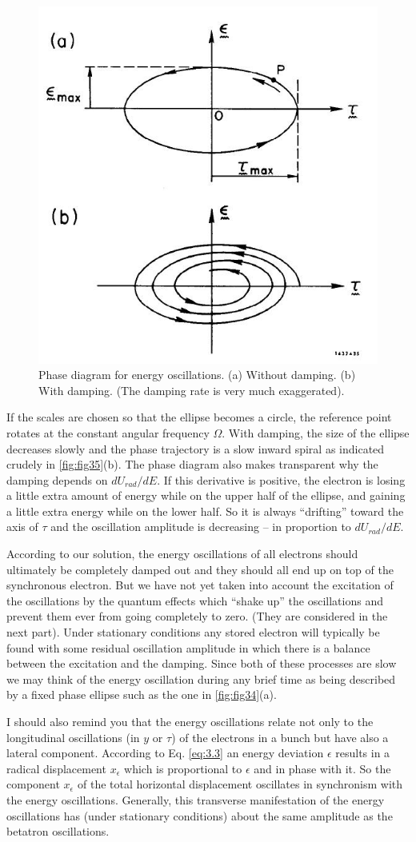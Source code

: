 \begin{figure}[!htb]
	\centering
	\includegraphics[width=0.6\linewidth]{./Figuras/fig35.jpeg}
	\caption{Phase diagram for energy oscillations. (a) Without damping. (b) With damping. (The damping rate is very much exaggerated).}
	\label{fig:fig35}
\end{figure}

If the scales are chosen so that the ellipse becomes a circle, the reference point rotates at the constant angular frequency $\Omega$. With damping, the size of the ellipse decreases slowly and the phase trajectory is a slow inward spiral as indicated crudely in \autoref{fig:fig35}(b). The phase diagram also makes transparent why the damping depends on $dU_{rad}/dE$. If this derivative is positive, the electron is losing a little extra amount of energy while on the upper half of the ellipse, and gaining a little extra energy while on the lower half. So it is always “drifting” toward the axis of $\tau$ and the oscillation amplitude is decreasing -- in proportion to $dU_{rad}/dE$.

According to our solution, the energy oscillations of all electrons should ultimately be completely damped out and they should all end up on top of the synchronous electron. But we have not yet taken into account the excitation of the oscillations by the quantum effects which “shake up” the oscillations and prevent them ever from going completely to zero. (They are considered in the next part). Under stationary conditions any stored electron will typically be found with some residual oscillation amplitude in which there is a balance between the excitation and the damping. Since both of these processes are slow we may think of the energy oscillation during any brief time as being described by a fixed phase ellipse such as the one in \autoref{fig:fig34}(a).

I should also remind you that the energy oscillations relate not only to the longitudinal oscillations (in $y$ or $\tau$) of the electrons in a bunch but have also a lateral component. According to Eq. \eqref{eq:3.3} an energy deviation $\epsilon$ results in a radical displacement $x_\epsilon$ which is proportional to $\epsilon$ and in phase with it. So the component $x_\epsilon$ of the total horizontal displacement oscillates in synchronism with the energy oscillations. Generally, this transverse manifestation of the energy oscillations has (under stationary conditions) about the same amplitude as the betatron oscillations.
